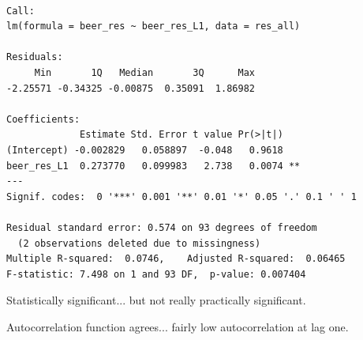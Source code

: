 \documentclass{beamer}\usepackage[]{graphicx}\usepackage[]{color}
\makeatletter
\newenvironment{kframe}{%
 \def\at@end@of@kframe{}%
 \ifinner\ifhmode%
  \def\at@end@of@kframe{\end{minipage}}%
  \begin{minipage}{\columnwidth}%
 \fi\fi%
 \def\FrameCommand##1{\hskip\@totalleftmargin \hskip-\fboxsep
 \colorbox{shadecolor}{##1}\hskip-\fboxsep
     \hskip-\linewidth \hskip-\@totalleftmargin \hskip\columnwidth}%
 \MakeFramed {\advance\hsize-\width
   \@totalleftmargin\z@ \linewidth\hsize
   \@setminipage}}%
 {\par\unskip\endMakeFramed%
 \at@end@of@kframe}
\newenvironment{knitrout}{}{} %
\makeatother
\begin{document}
\begin{darkframes}
\begin{frame}[fragile]
\begin{knitrout}
\begin{kframe}
\begin{verbatim}

Call:
lm(formula = beer_res ~ beer_res_L1, data = res_all)

Residuals:
     Min       1Q   Median       3Q      Max 
-2.25571 -0.34325 -0.00875  0.35091  1.86982 

Coefficients:
             Estimate Std. Error t value Pr(>|t|)   
(Intercept) -0.002829   0.058897  -0.048   0.9618   
beer_res_L1  0.273770   0.099983   2.738   0.0074 **
---
Signif. codes:  0 '***' 0.001 '**' 0.01 '*' 0.05 '.' 0.1 ' ' 1

Residual standard error: 0.574 on 93 degrees of freedom
  (2 observations deleted due to missingness)
Multiple R-squared:  0.0746,	Adjusted R-squared:  0.06465 
F-statistic: 7.498 on 1 and 93 DF,  p-value: 0.007404
\end{verbatim}
\end{kframe}
\end{knitrout}
Statistically significant... but not really practically significant.
\end{frame}

\begin{frame}[fragile]
\begin{knitrout}


\end{knitrout}
      Autocorrelation function agrees... fairly low autocorrelation at lag one.
\end{frame}
  \end{darkframes}
\end{document}
